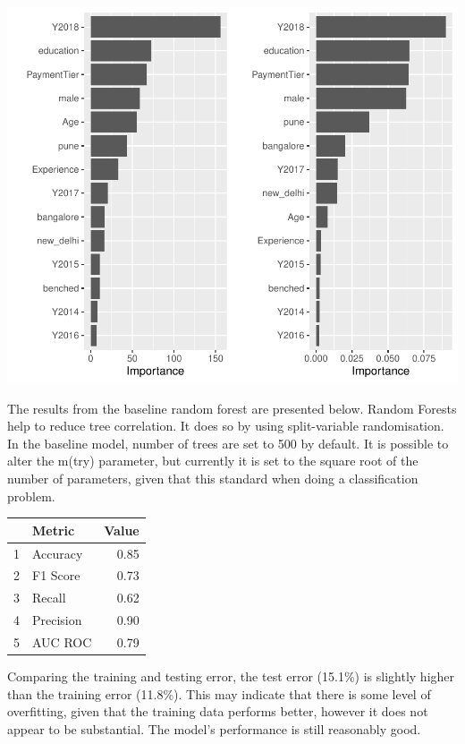 \documentclass[11pt,preprint, authoryear]{elsarticle}
\let\origtable\table
\let\endorigtable\endtable
\renewenvironment{table}[1][2] {
    \expandafter\origtable\expandafter[H]
} {
    \endorigtable
}
\numberwithin{equation}{section}
\numberwithin{figure}{section}
\numberwithin{table}{section}
\begin{document}
\includegraphics{Final_project_files/figure-latex/unnamed-chunk-13-1.pdf}

The results from the baseline random forest are presented below. Random
Forests help to reduce tree correlation. It does so by using
split-variable randomisation. In the baseline model, number of trees are
set to 500 by default. It is possible to alter the m(try) parameter, but
currently it is set to the square root of the number of parameters,
given that this standard when doing a classification problem.

\begin{table}[H]
\centering
\begin{tabular}{rlr}
  \hline
 & Metric & Value \\ 
  \hline
1 & Accuracy & 0.85 \\ 
  2 & F1 Score & 0.73 \\ 
  3 & Recall & 0.62 \\ 
  4 & Precision & 0.90 \\ 
  5 & AUC ROC & 0.79 \\ 
   \hline
\end{tabular}
\caption{Metrics for Baseline Random Forest \label{tab1}} 
\end{table}

Comparing the training and testing error, the test error (15.1\%) is
slightly higher than the training error (11.8\%). This may indicate that
there is some level of overfitting, given that the training data
performs better, however it does not appear to be substantial. The
model's performance is still reasonably good.
\end{document}
